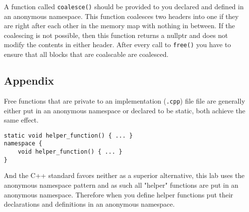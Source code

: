 \documentclass{article}
\begin{document}
A function called \texttt{coalesce()} should be provided to you declared and
defined in an anonymous namespace.  This function coalesces two headers into
one if they are right after each other in the memory map with nothing in
between.  If the coalescing is not possible, then this function returns a
nullptr and does not modify the contents in either header.  After every call
to \texttt{free()} you have to ensure that all blocks that are coalscable are
coalesced.

\subsection{Appendix}
Free functions that are private to an implementation (\texttt{.cpp}) file file
are generally either put in an anonymous namespace or declared to be static,
both achieve the same effect.
\begin{lstlisting}
static void helper_function() { ... }
namespace {
    void helper_function() { ... }
}
\end{lstlisting}

And the C++ standard favors neither as a superior alternative, this lab uses
the anonymous namespace pattern and as such all "helper" functions are put in
an anonymous namespace.  Therefore when you define helper functions put their
declarations and definitions in an anonymous namespace.
\end{document}
